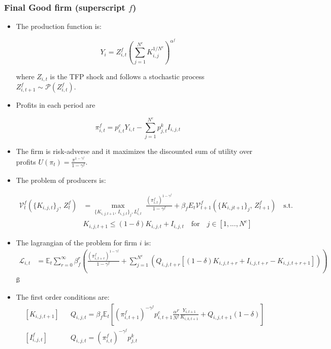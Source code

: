 \documentclass[11pt]{article}
\newcommand{\E}{\mathbb{E}}
\numberwithin{equation}{section}
\begin{document}
\begin{itemize}
	\subsubsection{Final Good firm (superscript $f$)}
	
	\begin{itemize}
		
		\item The production function is:
		
		$$Y_i = Z^f_{i,t} \left( \sum_{j=1}^{N^c } K^{1/N^c}_{i,j}\right)^{\alpha^f}$$
		
		where $Z_{i,t}$ is the TFP shock and follows a stochastic process $Z^f_{i,t+1} \sim \mathcal{P}(Z^f_{i,t})$. 
		
		\item Profits in each period are
		
		$$\pi^f_{i,t}=p^c_{i,t} Y_{i,t}-\sum_{j=1}^{N^c} p^k_{j,t} I_{i,j,t}$$
		
		\item The firm is risk-adverse and it maximizes the discounted sum of utility over profits $U(\pi_t) = \frac{\pi^{1-\gamma^f}}{1-\gamma^f}$.
		
		\item The problem of producers is:
		
		\begin{align*}
		\mathcal{V}_{t}^{f}\left(\{K_{i,j,t}\}_j,\,Z_t^f\right)&=\max_{\{K_{i,j,t+1},\, I_{i,j,t}\}_j,  L^f_{i,t}}\,\,
		\frac{\left(\pi_{i,t}^f\right)^{1-\gamma^f}}{1-\gamma^f}+\beta_f E_{t}\mathcal{V}^f_{t+1}(\{K_{i,jt+1}\}_j,\,Z_{t+1}^f)\quad\text{{s.t.}}\\
		&K_{i,j,t+1} \leq(1-\delta)K_{i,j,t}+I_{i,j,t} \quad \text{for} \quad j \in [1,...,N^c]
		\end{align*}
		
		\item The lagrangian of the problem for firm $i$ is:
		\begin{align*}
		\mathcal{L}_{i,t} &= \E_t \sum_{r=0}^{\infty}\beta^r_f \left(\frac{\left(\pi_{i,t+r}^f\right)^{1-\gamma^f}}{1-\gamma^f} +
		\sum_{j=1}^{N^c} \left(Q_{i,j,t+r} [(1-\delta)K_{i,j,t+r}+I_{i,j,t+r} -K_{i,j,t+r+1}]\right) \right)
		\end{align*}ß
		
		\item The first order conditions are:
		\begin{align}
		& \left[K_{i,j,t+1}\right]
		&&
		Q_{i,j,t} =\beta_f \E_t \left[\left(\pi_{i,t+1}^f\right)^{-\gamma^f} p^c_{i,t+1} \frac{\alpha^F}{N^f} \frac{Y_{i,t+1}}{K_{i,k,t+1}} +Q_{i,j,t+1} (1-\delta) \right]
		\\
		& \left[ I^f_{i,j,t} \right]
		&&
		Q_{i,j,t} = \left(\pi_{i,t}^f\right)^{-\gamma^f} p^k_{j,t}
		\end{align}
		

\end{itemize}
\end{itemize}
\end{document}
